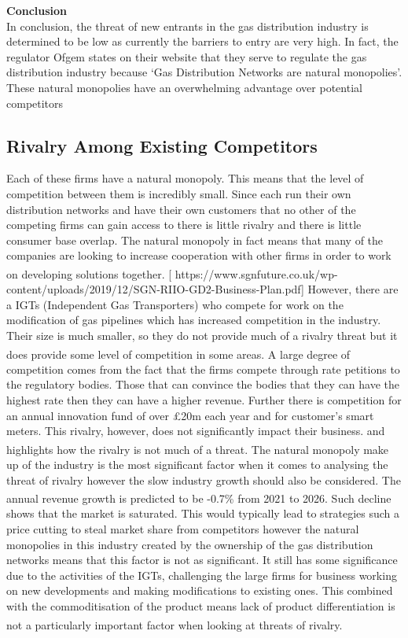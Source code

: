 \documentclass[11pt]{article}		%
\newcommand{\supercite}[1]{\textsuperscript{\cite{#1}}}		%
\begin{document}
			    \textbf{Conclusion}\\
                In conclusion, the threat of new entrants in the gas distribution industry is determined to be low as currently the barriers to entry are very high. In fact, the regulator Ofgem states on their website that they serve to regulate the gas distribution industry because ‘Gas Distribution Networks are natural monopolies’. These natural monopolies have an overwhelming advantage over potential competitors
        \subsection[Rivalry Among Existing Competitors]{Rivalry Among Existing Competitors}
                Each of these firms have a natural monopoly. This means that the level of competition between them is incredibly small. Since each run their own distribution networks and have their own customers that no other of the competing firms can gain access to there is little rivalry and there is little consumer base overlap. The natural monopoly in fact means that many of the companies are looking to increase cooperation with other firms in order to work on developing solutions together.\supercite{SGN-GD2} [  https://www.sgnfuture.co.uk/wp-content/uploads/2019/12/SGN-RIIO-GD2-Business-Plan.pdf]
                However, there are a IGTs (Independent Gas Transporters) who compete for work on the modification of gas pipelines which has increased competition in the industry. Their size is much smaller, so they do not provide much of a rivalry threat but it does provide some level of competition in some areas.\supercite{Gas_Distribution_Industry} 
                A large degree of competition comes from the fact that the firms compete through rate petitions to the regulatory bodies. Those that can convince the bodies that they can have the highest rate then they can have a higher revenue. Further there is competition for an annual innovation fund of over £20m each year and for customer’s smart meters. This rivalry, however, does not significantly impact their business. and highlights how the rivalry is not much of a threat.\supercite{Gas_Distribution_Industry}
                The natural monopoly make up of the industry is the most significant factor when it comes to analysing the threat of rivalry however the slow industry growth should also be considered. The annual revenue growth is predicted to be -0.7\% from 2021 to 2026.\supercite{Gas_Distribution_Industry} Such decline shows that the market is saturated. This would typically lead to strategies such a price cutting to steal market share from competitors however the natural monopolies in this industry created by the ownership of the gas distribution networks means that this factor is not as significant. It still has some significance due to the activities of the IGTs, challenging the large firms for business working on new developments and making modifications to existing ones. This combined with the commoditisation of the product means lack of product differentiation is not a particularly important factor when looking at threats of rivalry.\supercite{Gas_Distribution_Industry}
\end{document}
